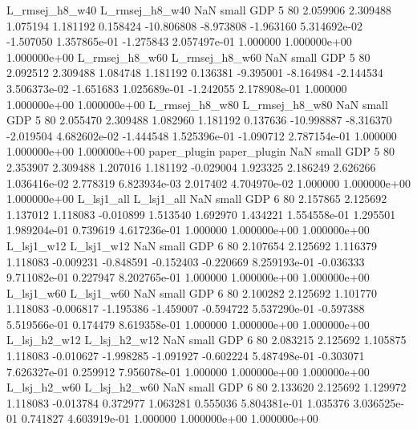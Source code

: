 L_rmsej_h8_w40 L_rmsej_h8_w40                   NaN      small      GDP                 5 80 2.059906       2.309488 1.075194       1.181192    0.158424    -10.806808     -8.973808    -1.963160   5.314692e-02 -1.507050 1.357865e-01    -1.275843   2.057497e-01            1.000000    1.000000e+00        1.000000e+00
L_rmsej_h8_w60 L_rmsej_h8_w60                   NaN      small      GDP                 5 80 2.092512       2.309488 1.084748       1.181192    0.136381     -9.395001     -8.164984    -2.144534   3.506373e-02 -1.651683 1.025689e-01    -1.242055   2.178908e-01            1.000000    1.000000e+00        1.000000e+00
L_rmsej_h8_w80 L_rmsej_h8_w80                   NaN      small      GDP                 5 80 2.055470       2.309488 1.082960       1.181192    0.137636    -10.998887     -8.316370    -2.019504   4.682602e-02 -1.444548 1.525396e-01    -1.090712   2.787154e-01            1.000000    1.000000e+00        1.000000e+00
  paper_plugin   paper_plugin                   NaN      small      GDP                 5 80 2.353907       2.309488 1.207016       1.181192   -0.029004      1.923325      2.186249     2.626266   1.036416e-02  2.778319 6.823934e-03     2.017402   4.704970e-02            1.000000    1.000000e+00        1.000000e+00
    L_lsj1_all     L_lsj1_all                   NaN      small      GDP                 6 80 2.157865       2.125692 1.137012       1.118083   -0.010899      1.513540      1.692970     1.434221   1.554558e-01  1.295501 1.989204e-01     0.739619   4.617236e-01            1.000000    1.000000e+00        1.000000e+00
    L_lsj1_w12     L_lsj1_w12                   NaN      small      GDP                 6 80 2.107654       2.125692 1.116379       1.118083   -0.009231     -0.848591     -0.152403    -0.220669   8.259193e-01 -0.036333 9.711082e-01     0.227947   8.202765e-01            1.000000    1.000000e+00        1.000000e+00
    L_lsj1_w60     L_lsj1_w60                   NaN      small      GDP                 6 80 2.100282       2.125692 1.101770       1.118083   -0.006817     -1.195386     -1.459007    -0.594722   5.537290e-01 -0.597388 5.519566e-01     0.174479   8.619358e-01            1.000000    1.000000e+00        1.000000e+00
  L_lsj_h2_w12   L_lsj_h2_w12                   NaN      small      GDP                 6 80 2.083215       2.125692 1.105875       1.118083   -0.010627     -1.998285     -1.091927    -0.602224   5.487498e-01 -0.303071 7.626327e-01     0.259912   7.956078e-01            1.000000    1.000000e+00        1.000000e+00
  L_lsj_h2_w60   L_lsj_h2_w60                   NaN      small      GDP                 6 80 2.133620       2.125692 1.129972       1.118083   -0.013784      0.372977      1.063281     0.555036   5.804381e-01  1.035376 3.036525e-01     0.741827   4.603919e-01            1.000000    1.000000e+00        1.000000e+00
